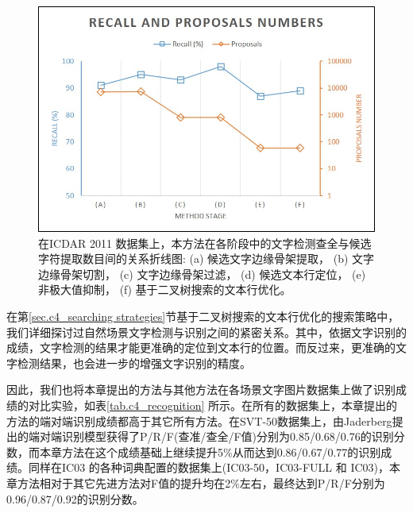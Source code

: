         \begin{figure}[!h]
        \centering
        \includegraphics[width=\textwidth]{./figures/c4_recall_proposals.jpg}
        \caption{在ICDAR 2011 数据集上，本方法在各阶段中的文字检测查全与候选字符提取数目间的关系折线图: (a) 候选文字边缘骨架提取， (b) 文字边缘骨架切割， (c) 文字边缘骨架过滤， (d) 候选文本行定位， (e)非极大值抑制， (f) 基于二叉树搜索的文本行优化。}
        \label{fig.c4_recall_proposals}
        \end{figure}

        在第\ref{sec.c4_searching strategies}节基于二叉树搜索的文本行优化的搜索策略中，我们详细探讨过自然场景文字检测与识别之间的紧密关系。其中，依据文字识别的成绩，文字检测的结果才能更准确的定位到文本行的位置。而反过来，更准确的文字检测结果，也会进一步的增强文字识别的精度。

        因此，我们也将本章提出的方法与其他方法在各场景文字图片数据集上做了识别成绩的对比实验，如表\ref{tab.c4_recognition} 所示。在所有的数据集上，本章提出的方法的端对端识别成绩都高于其它所有方法。在SVT-50数据集上，由Jaderberg\cite{Jaderberg2016Reading}提出的端对端识别模型获得了P/R/F(查准/查全/F值)分别为0.85/0.68/0.76的识别分数，而本章方法在这个成绩基础上继续提升5\%从而达到0.86/0.67/0.77的识别成绩。同样在IC03 的各种词典配置的数据集上(IC03-50，IC03-FULL 和 IC03)，本章方法相对于其它先进方法对F值的提升均在2\%左右，最终达到P/R/F分别为0.96/0.87/0.92的识别分数。

